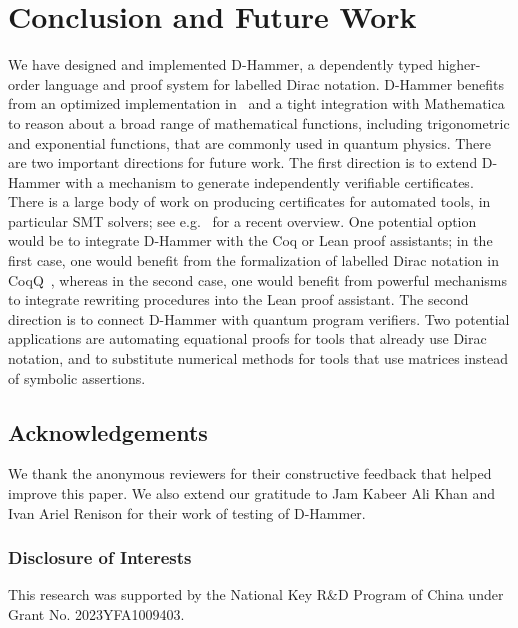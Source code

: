 \section{Conclusion and Future Work}
We have designed and implemented D-Hammer, a dependently typed
higher-order language and proof system for labelled Dirac
notation. D-Hammer benefits from an optimized implementation in
\CC\ and a tight integration with Mathematica to reason about a broad
range of mathematical functions, including trigonometric and
exponential functions, that are commonly used in quantum physics.
There are two important directions for future work. 
The first direction is to extend D-Hammer with a mechanism to
generate independently verifiable certificates.  There is a large body
of work on producing certificates for automated tools, in particular
SMT solvers; see e.g.~\cite{DBLP:journals/cacm/BarbosaBCDKLNNOPRTZ23}
for a recent overview. One potential option would be to integrate
D-Hammer with the Coq or Lean proof assistants; in the first case, one
would benefit from the formalization of labelled Dirac notation in
CoqQ~\cite{Zhou2023}, whereas in the second case, one would benefit
from powerful mechanisms to integrate rewriting procedures into the
Lean proof assistant. The second direction is to connect
D-Hammer with quantum program verifiers. Two potential applications
are automating equational proofs for tools that already use Dirac
notation, and to substitute numerical methods for tools that use
matrices instead of symbolic assertions.

\subsection*{Acknowledgements}
\small
We thank the anonymous reviewers for their constructive feedback that helped improve this paper. We also extend our gratitude to Jam Kabeer Ali Khan and Ivan Ariel Renison for their work of testing of D-Hammer.

\normalsize

\subsubsection*{Disclosure of Interests}
\small
This research was supported by the National Key R\&D Program of China under Grant No. 2023YFA1009403.
\normalsize




